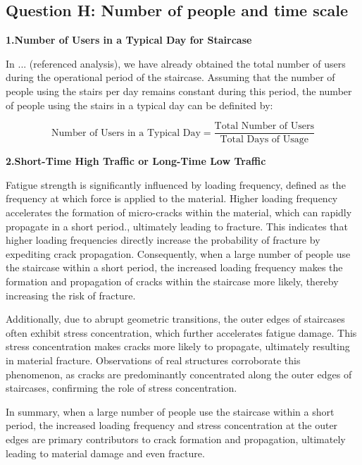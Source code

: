 \documentclass{mcmthesis}
\begin{document}
\subsection{Question H: Number of people and time scale}


\textbf{1.Number of Users in a Typical Day for Staircase }


In ... (referenced analysis), we have already obtained the total number of users during the operational period of the staircase. Assuming that the number of people using the stairs per day remains constant during this period, the number of people using the stairs in a typical day can be definited by:

\[\text{Number of Users in a Typical Day} = \frac{\text{Total Number of Users}}{\text{Total Days of Usage}}\]

\textbf{2.Short-Time High Traffic or Long-Time Low Traffic}


Fatigue strength is significantly influenced by loading frequency, defined as the frequency at which force is applied to the
material\cite{Yokobori1976}\cite{Takezono1980}\cite{HeimbachHeimbach+1970+377+380}. Higher loading frequency accelerates the formation of micro-cracks within the material, which can rapidly propagate in a short
period\cite{ SJESAC88A958454EEE1CD4ED092FB8A0E8F8}.\cite{ SJESF46245B4D88236414B6977C781CEC048}, ultimately leading to fracture. This indicates that higher loading frequencies directly increase the probability of fracture by expediting crack propagation. Consequently, when a large number of people use the staircase within a short period, the increased loading frequency makes the formation and propagation of cracks within the staircase more likely, thereby increasing the risk of fracture.

Additionally, due to abrupt geometric transitions, the outer edges of staircases often exhibit stress concentration, which further accelerates fatigue damage. This stress concentration makes cracks more likely to propagate, ultimately resulting in material fracture. Observations of real structures corroborate this phenomenon, as cracks are predominantly concentrated along the outer edges of staircases, confirming the role of stress concentration.

In summary, when a large number of people use the staircase within a short period, the increased loading frequency and stress concentration at the outer edges are primary contributors to crack formation and propagation, ultimately leading to material damage and even fracture.
\end{document}
